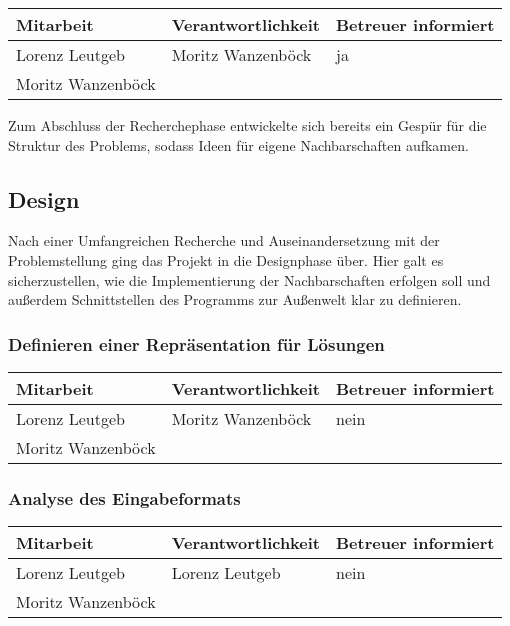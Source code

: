 \begin{center}
\begin{tabular}{lll}
	Mitarbeit & Verantwortlichkeit & Betreuer informiert \\
	\hline
	Lorenz Leutgeb & Moritz Wanzenböck & ja \\
	Moritz Wanzenböck & & \\
\end{tabular}
\end{center}

Zum Abschluss der Recherchephase entwickelte sich bereits ein Gespür für die Struktur des Problems, sodass Ideen für eigene Nachbarschaften aufkamen.

\subsection{Design}
Nach einer Umfangreichen Recherche und Auseinandersetzung mit der Problemstellung ging das Projekt in die Designphase über. Hier galt es sicherzustellen, wie die Implementierung der Nachbarschaften erfolgen soll und außerdem Schnittstellen des Programms zur Außenwelt klar zu definieren.

\subsubsection{ Definieren einer Repräsentation für Lösungen}

\begin{center}
\begin{tabular}{lll}
	Mitarbeit & Verantwortlichkeit & Betreuer informiert \\
	\hline
	Lorenz Leutgeb & Moritz Wanzenböck & nein \\
	Moritz Wanzenböck & & \\
\end{tabular}
\end{center}

\subsubsection{ Analyse des Eingabeformats}

\begin{center}
\begin{tabular}{lll}
	Mitarbeit & Verantwortlichkeit & Betreuer informiert \\
	\hline
	Lorenz Leutgeb & Lorenz Leutgeb & nein \\
	Moritz Wanzenböck & & \\
\end{tabular}
\end{center}

